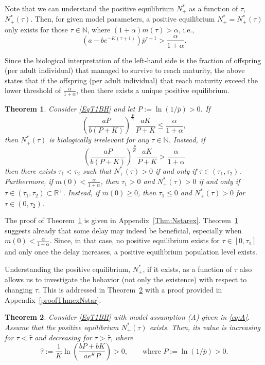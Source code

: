 \documentclass{article}
\newtheorem{theorem}{Theorem}
\numberwithin{theorem}{section}
\begin{document}
{Note that we can understand the positive equilibrium $N^*_+$ as a function of $\tau$, $N^*_+(\tau)$. Then, for given model parameters,  a positive equilibrium $N^*_+=N^*_+(\tau)$ only exists for those $\tau\in \mathbb{N}$, where $(1+\alpha)m(\tau)>\alpha$, i.e.,
\begin{equation}\label{condNstar}
\left(a - b e^{-K(\tau+1)}\right)
\overline{p}^{\tau+1}>\frac{\alpha}{1+\alpha}.
\end{equation}

Since the biological interpretation of the left-hand side is the fraction of offspring (per adult individual) that managed to survive to reach maturity, the above states that if the offspring (per adult individual) that reach maturity exceed the lower threshold of $\frac{\alpha}{1+\alpha}$, then there exists a unique positive equilibrium.  


\begin{theorem}\label{Nstarex}
Consider \eqref{EqT1BH} and let $P:=\ln(1/\overline{p})>0$. 
If $$ \left(\frac{aP}{b(P+K)}\right)^{\frac{P}{K}}\frac{aK}{P+K}\leq \frac{\alpha}{1+\alpha},$$
then $N^*_+(\tau)$ is biologically irrelevant for any $\tau\in \mathbb{N}$. 
    Instead, if 
$$ \left(\frac{aP}{b(P+K)}\right)^{\frac{P}{K}}\frac{aK}{P+K}>\frac{\alpha}{1+\alpha}$$
then there exists $\tau_1<\tau_2$ such that $N^*_+(\tau)>0$ if and only if $\tau\in (\tau_1,\tau_2)$.  
Furthermore, if $m(0)<\frac{\alpha}{1+\alpha}$, then 
 $\tau_1>0$ and $N^*_+(\tau)>0$ if and only if $\tau\in (\tau_1,\tau_2)\subset \mathbb{R}^+$. Instead, if $m(0)\geq 0$, then $\tau_1\leq 0$ and $N^*_+(\tau)>0$ for $\tau\in (0,\tau_2)$. 
\end{theorem}

The proof of Theorem~\ref{Nstarex} is given in Appendix~\ref{Thm:Nstarex}. Theorem~\ref{Nstarex} suggests already that some delay may indeed be beneficial, especially when $m(0)<\frac{\alpha}{1+\alpha}$. Since, in that case, no positive equilibrium exists for $\tau\in [0,\tau_1]$ and only once the delay increases, a positive equilibrium population level exists.

Understanding the positive equilibrium, $N^*_+$, if it exists, as a function of $\tau$ also allows us to investigate the behavior (not only the existence) with respect to changing $\tau$. This is addressed in Theorem~\ref{ThmexNstar} with a proof provided in Appendix~\ref{proofThmexNstar}. 

\begin{theorem}\label{ThmexNstar}
Consider \eqref{EqT1BH} with model assumption (A) given in \eqref{eq:A}. Assume that the positive equilibrium $N^*_+(\tau)$ exists. Then, its value is increasing for $\tau<\widehat{\tau}$ and decreasing for $\tau>\widehat{\tau}$, where 
\begin{equation*}
\widehat{\tau}:=\frac{1}{K}\ln\left( \frac{bP+bK}{ae^{K}P}  \right)>0, \qquad \mbox{where} \, \, P:=\ln(1/\overline{p})>0.
\end{equation*}
\end{theorem}


}
\end{document}
